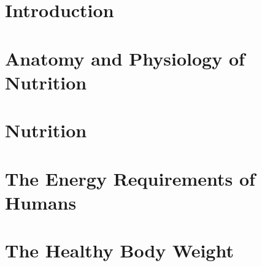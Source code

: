 \documentclass[../main.tex]{subfiles}
\begin{document}
\chapter{Introduction}


\chapter{Anatomy and Physiology of Nutrition}


\chapter{Nutrition}


\chapter{The Energy Requirements of Humans}


\chapter{The Healthy Body Weight}





\end{document}
